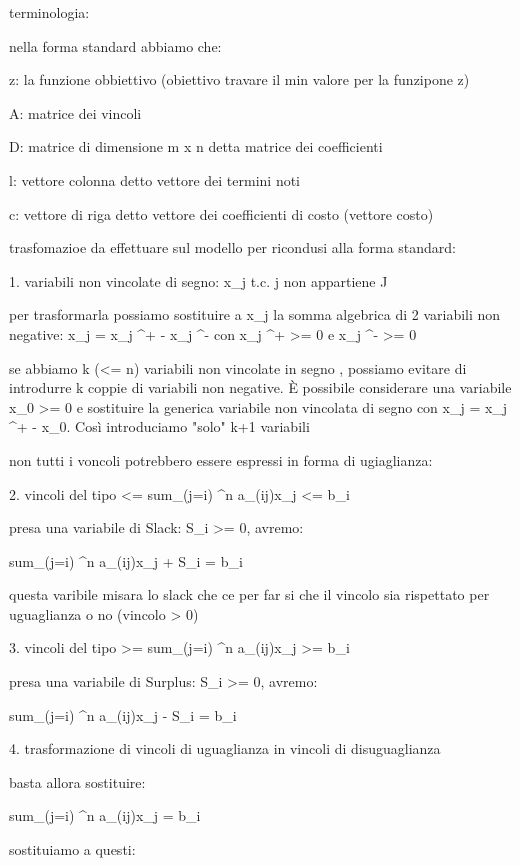 terminologia:

nella forma standard abbiamo che:

z: la funzione obbiettivo (obiettivo travare il min valore per la funzipone z)

A: matrice dei vincoli

D: matrice di dimensione m x n detta matrice dei coefficienti

l: vettore colonna detto vettore dei termini noti

c: vettore di riga detto vettore dei coefficienti di costo (vettore costo)






trasfomazioe da effettuare sul modello per ricondusi alla forma standard:

1. variabili non vincolate di segno: x_j t.c. j non appartiene J

	per trasformarla possiamo sostituire a x_j la somma algebrica di 2 variabili non negative: x_j = x_j ^+ - x_j ^- con x_j ^+ >= 0 e x_j ^- >= 0

	se abbiamo k (<= n) variabili non vincolate in segno , possiamo evitare di introdurre k coppie di variabili non negative. È possibile considerare una variabile x_0 >= 0 e sostituire la generica variabile non vincolata di segno con x_j = x_j ^+ - x_0. Così introduciamo "solo" k+1 variabili



non tutti i voncoli potrebbero essere espressi in forma di ugiaglianza:

2. vincoli del tipo <=
	sum_(j=i) ^n a_(ij)x_j <= b_i
	
	presa una variabile di Slack: S_i >= 0, avremo:
	
	sum_(j=i) ^n a_(ij)x_j + S_i = b_i
	
	
	questa varibile misara lo slack che ce per far si che il vincolo sia rispettato per uguaglianza o no (vincolo > 0)
	
3. vincoli del tipo >=
	sum_(j=i) ^n a_(ij)x_j >= b_i
	
	presa una variabile di Surplus: S_i >= 0, avremo:

	
	sum_(j=i) ^n a_(ij)x_j - S_i = b_i



4. trasformazione di vincoli di uguaglianza in vincoli di disuguaglianza

	basta allora sostituire:
	
	sum_(j=i) ^n a_(ij)x_j = b_i

	sostituiamo a questi:
	

